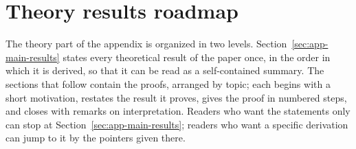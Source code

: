 \section{Theory results roadmap}
\label{sec:app-theory-roadmap}

The theory part of the appendix is organized in two levels.
Section~\ref{sec:app-main-results}
states every theoretical result of the paper once, in the order in which it is
derived, so that it can be read as a self-contained summary.  The sections
that follow contain the proofs, arranged by topic; each begins with a short
motivation, restates the result it proves, gives the proof in numbered steps,
and closes with remarks on interpretation.  
Readers who want the statements only can stop at Section~\ref{sec:app-main-results}; 
readers who want a specific derivation can jump to it by the pointers given there. 


